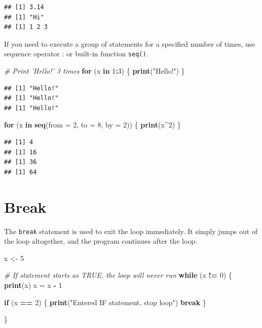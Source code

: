 \documentclass[
]{book}
\newenvironment{Shaded}{\begin{snugshade}}{\end{snugshade}}
\newcommand{\CommentTok}[1]{\textcolor[rgb]{0.56,0.35,0.01}{\textit{#1}}}
\newcommand{\ControlFlowTok}[1]{\textcolor[rgb]{0.13,0.29,0.53}{\textbf{#1}}}
\newcommand{\DataTypeTok}[1]{\textcolor[rgb]{0.13,0.29,0.53}{#1}}
\newcommand{\DecValTok}[1]{\textcolor[rgb]{0.00,0.00,0.81}{#1}}
\newcommand{\KeywordTok}[1]{\textcolor[rgb]{0.13,0.29,0.53}{\textbf{#1}}}
\newcommand{\NormalTok}[1]{#1}
\newcommand{\OperatorTok}[1]{\textcolor[rgb]{0.81,0.36,0.00}{\textbf{#1}}}
\newcommand{\StringTok}[1]{\textcolor[rgb]{0.31,0.60,0.02}{#1}}
\begin{document}
\begin{verbatim}
## [1] 3.14
## [1] "Hi"
## [1] 1 2 3
\end{verbatim}

If you need to execute a group of statements for a specified number of times, use sequence operator : or built-in function \texttt{seq()}.

\begin{Shaded}
\begin{Highlighting}[]
\CommentTok{# Print 'Hello!' 3 times}
\ControlFlowTok{for}\NormalTok{ (x }\ControlFlowTok{in} \DecValTok{1}\OperatorTok{:}\DecValTok{3}\NormalTok{) \{}
    \KeywordTok{print}\NormalTok{(}\StringTok{"Hello!"}\NormalTok{)}
\NormalTok{\}}
\end{Highlighting}
\end{Shaded}

\begin{verbatim}
## [1] "Hello!"
## [1] "Hello!"
## [1] "Hello!"
\end{verbatim}

\begin{Shaded}
\begin{Highlighting}[]
\ControlFlowTok{for}\NormalTok{ (x }\ControlFlowTok{in} \KeywordTok{seq}\NormalTok{(}\DataTypeTok{from =} \DecValTok{2}\NormalTok{, }\DataTypeTok{to =} \DecValTok{8}\NormalTok{, }\DataTypeTok{by =} \DecValTok{2}\NormalTok{)) \{}
    \KeywordTok{print}\NormalTok{(x}\OperatorTok{^}\DecValTok{2}\NormalTok{)}
\NormalTok{\}}
\end{Highlighting}
\end{Shaded}

\begin{verbatim}
## [1] 4
## [1] 16
## [1] 36
## [1] 64
\end{verbatim}

\hypertarget{break}{%
\section{Break}\label{break}}

The \texttt{break} statement is used to exit the loop immediately. It simply jumps out of the loop altogether, and the program continues after the loop.

\begin{Shaded}
\begin{Highlighting}[]
\NormalTok{x <-}\StringTok{ }\DecValTok{5}

\CommentTok{# If statement starts as TRUE, the loop will never run}
\ControlFlowTok{while}\NormalTok{ (x }\OperatorTok{!=}\StringTok{ }\DecValTok{0}\NormalTok{) \{}
    \KeywordTok{print}\NormalTok{(x)}
\NormalTok{    x =}\StringTok{ }\NormalTok{x }\OperatorTok{-}\StringTok{ }\DecValTok{1}

    \ControlFlowTok{if}\NormalTok{ (x }\OperatorTok{==}\StringTok{ }\DecValTok{2}\NormalTok{) \{}
        \KeywordTok{print}\NormalTok{(}\StringTok{"Entered IF statement, stop loop"}\NormalTok{)}
        \ControlFlowTok{break}
\NormalTok{    \}}

\NormalTok{\}}
\end{Highlighting}
\end{Shaded}
\end{document}
